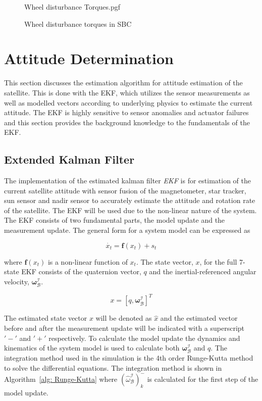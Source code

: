 \begin{figure}[!htb]
	\centering
	\def\pgfwidth{10cm}
	{Wheel disturbance Torques.pgf}
	
	\caption{Wheel disturbance torques in SBC}
	\label{fig:Wheel disturbance Torques}
\end{figure}

\section{Attitude Determination}
This section discusses the estimation algorithm for attitude estimation of the satellite. This is done with the EKF, which utilizes the sensor measurements as well as modelled vectors according to underlying physics to estimate the current attitude. The EKF is highly sensitive to sensor anomalies and actuator failures and this section provides the background knowledge to the fundamentals of the EKF.

\subsection{Extended Kalman Filter}
The implementation of the estimated kalman filter \emph{EKF} is for estimation of the current satellite attitude with sensor fusion of the magnetometer, star tracker, sun sensor and nadir sensor to accurately estimate the attitude and rotation rate of the satellite. The EKF will be used due to the non-linear nature of the system. The EKF consists of two fundamental parts, the model update and the measurement update. The general form for a system model can be expressed as

\begin{equation}
	\dot{x_t} = \mathbf{f}(x_t) + s_t
\end{equation}

where $\mathbf{f}(x_t)$ is a non-linear function of $x_t$. The state vector, $x$, for the full 7-state EKF consists of the quaternion vector, $q$ and the inertial-referenced angular velocity, $\boldsymbol{\omega}_{\mathcal{B}}^{\mathcal{I}}$.

\begin{equation}
	x = [q, \boldsymbol{\omega}_{\mathcal{B}}^{\mathcal{I}}]^T
\end{equation}

The estimated state vector $x$ will be denoted as $\hat{x}$ and the estimated vector before and after the measurement update will be indicated with a superscript $'-'$ and $'+'$ respectively. To calculate the model update the dynamics and kinematics of the system model is used to calculate both $\boldsymbol{\omega}_{\mathcal{B}}^{\mathcal{I}}$ and $q$. The integration method used in the simulation is the 4th order Runge-Kutta method to solve the differential equations. The integration method is shown in Algorithm~\ref{alg: Runge-Kutta} where $(\hat{\omega}_{\mathcal{B}}^{\mathcal{I}})_k^-$ is calculated for the first step of the model update.

